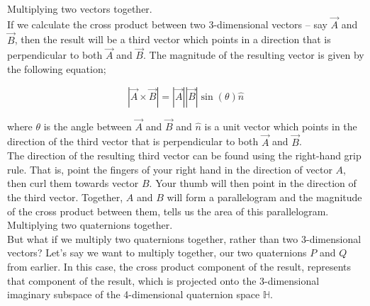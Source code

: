 \textbullet \; Multiplying two vectors together.  \\

If we calculate the cross product between two 3-dimensional vectors -- say \(\vec{A}\) and \(\vec{B}\), then the result
will be a third vector which points in a direction that is perpendicular to both \(\vec{A}\) and \(\vec{B}\).  The
magnitude of the resulting vector is given by the following equation;

\begin{equation}
    |\vec{A} \times \vec{B}| = |\vec{A}||\vec{B}|\sin(\theta)\hat{n}
\end{equation}
\vspace{0.0\baselineskip}

where \(\theta\) is the angle between \(\vec{A}\) and \(\vec{B}\) and \(\hat{n}\) is a unit vector which points in the direction of
the third vector that is perpendicular to both \(\vec{A}\) and \(\vec{B}\). \\

The direction of the resulting third vector can be found using the right-hand grip rule. That is, point the fingers of
your right hand in the direction of vector \(A\), then curl them towards vector \(B\). Your thumb will then point in the
direction of the third vector. Together, \(A\) and \(B\) will form a parallelogram and the magnitude of the cross
product between them, tells us the area of this parallelogram. \\

\textbullet \; Multiplying two quaternions together. \\

But what if we multiply two quaternions together, rather than two 3-dimensional vectors? Let's say we want to multiply
together, our two quaternions \(P\) and \(Q\) from earlier. In this case, the cross product component of the result,
represents that component of the result, which is projected onto the 3-dimensional imaginary subspace of the
4-dimensional quaternion space \(\mathbb{H}\).